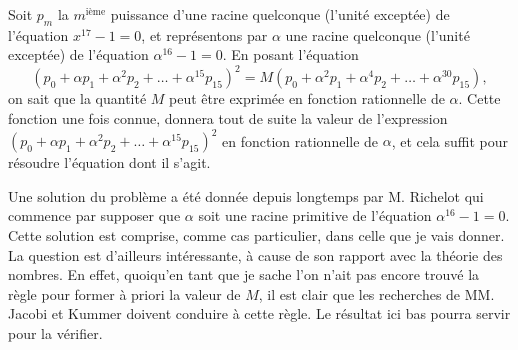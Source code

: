 \documentclass[11pt,a4paper]{book}
\begin{document}
Soit $p_m$ la $m^{\text{i\`{e}me}}$ puissance d'une racine quelconque (l'unit\'{e} except\'{e}e) de l'\'{e}quation $x^{17} - 1 = 0$, et repr\'{e}sentons par $\alpha$ une racine quelconque (l'unit\'{e} except\'{e}e) de l'\'{e}quation $\alpha^{16} - 1 = 0$. En posant l'\'{e}quation
\[
(p_0 + \alpha p_1 + \alpha^2 p_2 + \ldots + \alpha^{15} p_{15})^2 = M(p_0 + \alpha^2 p_1 + \alpha^4 p_2 + \ldots + \alpha^{30} p_{15}),
\]
on sait que la quantit\'{e} $M$ peut \^{e}tre exprim\'{e}e en fonction rationnelle de $\alpha$. Cette fonction une fois connue, donnera tout de suite la valeur de l'expression $(p_0 + \alpha p_1 + \alpha^2 p_2 + \ldots + \alpha^{15} p_{15})^2$ en fonction rationnelle de $\alpha$, et cela suffit pour r\'{e}soudre l'\'{e}quation dont il s'agit.

Une solution du probl\`{e}me a \'{e}t\'{e} donn\'{e}e depuis longtemps par M. Richelot qui commence par supposer que $\alpha$ soit une racine primitive de l'\'{e}quation $\alpha^{16} - 1 = 0$. Cette solution est comprise, comme cas particulier, dans celle que je vais donner. La question est d'ailleurs int\'{e}ressante, \`{a} cause de son rapport avec la th\'{e}orie des nombres. En effet, quoiqu'en tant que je sache l'on n'ait pas encore trouv\'{e} la r\`{e}gle pour former \`{a} priori la valeur de $M$, il est clair que les recherches de MM. Jacobi et Kummer doivent conduire \`{a} cette r\`{e}gle. Le r\'{e}sultat ici bas pourra servir pour la v\'{e}rifier.
\end{document}
